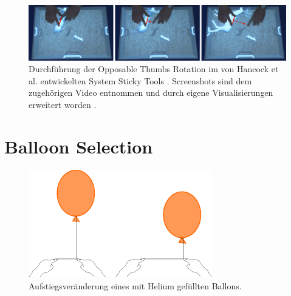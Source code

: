 \begin{figure}
	\begin{center}
		\includegraphics[width=12cm]{img/opposable_thumbs.pdf}
	\end{center}
	\caption{Durchführung der Opposable Thumbs Rotation im von Hancock et al. entwickelten System Sticky Tools \cite{hancock:2009}. Screenshots sind dem zugehörigen Video entnommen und durch eigene Visualisierungen erweitert worden \cite{hancock:2009:vid}.}
	\label{fig:opposable_thumbs}
\end{figure}


\section{Balloon Selection}
\label{sec:related_balloon_selection}

\begin{figure}
	\begin{center}
		\includegraphics[width=8cm]{img/baloon_concept.pdf}
	\end{center}
	\caption{Aufstiegsveränderung eines mit Helium gefüllten Ballons.}
	\label{fig:baloon_concept}
\end{figure}

